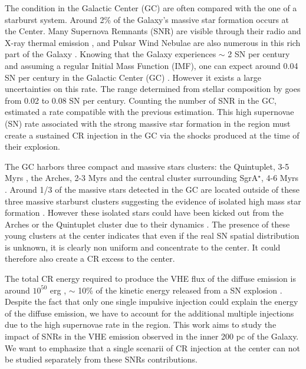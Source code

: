\documentclass[a4paper,fleqn,usenatbib]{mnras}
\begin{document}
The condition in the Galactic Center (GC) are often compared with the one of a starburst system. Around 2\% of the Galaxy's massive star formation occurs at the Center. Many Supernova Remnants (SNR) are visible through their radio and X-ray thermal emission \citep{2015MNRAS.453..172P}, and Pulsar Wind  Nebulae are also numerous in this rich part of the Galaxy \citep{2007yCat..21650173M}. Knowing that the Galaxy experiences $\sim$ 2 SN per century and assuming a regular Initial Mass Function (IMF), one can expect around 0.04 SN per century in the Galactic Center (GC) \citep{2011MNRAS.413..763C}. However it exists a large uncertainties on this rate. The range determined from stellar composition by \citet{2011MNRAS.413..763C} goes from 0.02 to 0.08 SN per century. Counting the number of SNR in the GC, \citet{2015MNRAS.453..172P} estimated a rate compatible with the previous estimation. This high supernovae (SN) rate associated with the strong massive star formation in the region must create a sustained CR injection in the GC via the shocks produced at the time of their explosion.  

The GC harbors three compact and massive stars clusters: the Quintuplet, 3-5 Myrs \citep{2004ApJ...611L.105N}, the Arches, 2-3 Myrs \citep{1999ApJ...525..750F} and the central cluster surrounding SgrA$^\star$, 4-6 Myrs \citep{2013ApJ...770...44L}. Around 1/3 of the massive stars detected in the GC are located outside of these three massive starburst clusters suggesting the evidence of isolated high mass star formation \citep{2010ApJ...725..188M}. However these isolated stars could have been kicked out from the Arches or the Quintuplet cluster due to their dynamics \citep{2014A&A...566A...6H}. The presence of these young clusters at the center indicates that even if the real SN spatial distribution is unknown, it is clearly non uniform and concentrate to the center. It could therefore also create a CR excess to the center. 

The total CR energy required to produce the VHE flux of the diffuse emission is around $10^{50}$ erg \citep{2006Natur.439..695A}, $\sim$ 10\% of the kinetic energy released from a SN explosion \citep{2011Ap&SS.336..257R}. Despite the fact that only one single impulsive injection could explain the energy of the diffuse emission, we have to account for the additional multiple injections due to the high supernovae rate in the region. This work aims to study the impact of SNRs in the VHE emission observed in the inner 200 pc of the Galaxy. We want to emphasize that a single scenarii of CR injection at the center \citep{2014arXiv1410.1678M, 2016Natur.531..476H} can not be studied separately from these SNRs contributions. 
\end{document}
